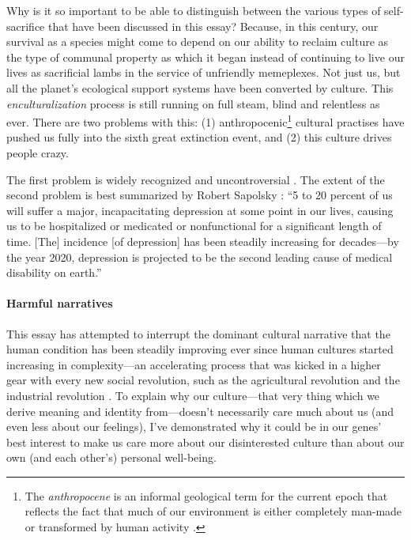\documentclass{article}
\begin{document}
Why is it so important to be able to distinguish between the various types
of self-sacrifice that have been discussed in this essay? Because, in this century,
our survival as a species might come to depend on our ability to reclaim culture
as the type of communal property as which it began instead of continuing to live
our lives as sacrificial lambs in the service of unfriendly memeplexes. Not
just us, but all the planet's ecological support systems have been converted by
culture. This \textit{enculturalization} process is still running on full
steam, blind and relentless as ever. There are two problems with this: (1)
anthropocenic\footnote{The \emph{anthropocene} is an informal geological term
for the current epoch that reflects the fact that much of our environment is
either completely man-made or transformed by human activity
\citep{revkin2011}.} cultural practises have pushed us fully into the sixth
great extinction event, and (2) this culture drives people crazy.

The first problem is widely recognized and uncontroversial \citep{iucn2009,
pimm1995}. The extent of the second problem is best summarized by Robert
Sapolsky \citeyearpar[ch.~14]{sapolsky2004}: “5 to 20 percent of us will suffer
a major, incapacitating depression at some point in our lives, causing us to be
hospitalized or medicated or nonfunctional for a significant length of time.
[The] incidence [of depression] has been steadily increasing for decades---by the year 2020,
depression is projected to be the second leading cause of medical disability on
earth.”

\paragraph{Harmful narratives}

This essay has attempted to interrupt the dominant cultural narrative that the
human condition has been steadily improving ever since human cultures started
increasing in complexity---an accelerating process that was kicked in a higher
gear with every new social revolution, such as the agricultural revolution and
the industrial revolution \citep{botton2013, quinn1992}. To explain why our
culture---that very thing which we derive meaning and identity from---doesn't
necessarily care much about us (and even less about our feelings), I've
demonstrated why it could be in our genes' best interest to make us care more
about our disinterested culture than about our own (and each other's) personal
well-being.
\end{document}

